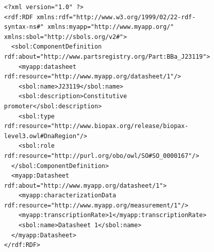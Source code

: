 \begin{figure}[ht]
\begin{lstlisting}
<?xml version="1.0" ?>
<rdf:RDF xmlns:rdf="http://www.w3.org/1999/02/22-rdf-syntax-ns#" xmlns:myapp="http://www.myapp.org/" xmlns:sbol="http://sbols.org/v2#">
  <sbol:ComponentDefinition rdf:about="http://www.partsregistry.org/Part:BBa_J23119">
    <myapp:datasheet rdf:resource="http://www.myapp.org/datasheet/1"/>
    <sbol:name>J23119</sbol:name>
    <sbol:description>Constitutive promoter</sbol:description>
    <sbol:type rdf:resource="http://www.biopax.org/release/biopax-level3.owl#DnaRegion"/>
    <sbol:role rdf:resource="http://purl.org/obo/owl/SO#SO_0000167"/>
  </sbol:ComponentDefinition>
  <myapp:Datasheet rdf:about="http://www.myapp.org/datasheet/1">
    <myapp:characterizationData rdf:resource="http://www.myapp.org/measurement/1"/>
    <myapp:transcriptionRate>1</myapp:transcriptionRate>
    <sbol:name>Datasheet 1</sbol:name>
  </myapp:Datasheet>
</rdf:RDF>

\end{lstlisting}
\label{ser:GenericTopLevel}
\end{figure}